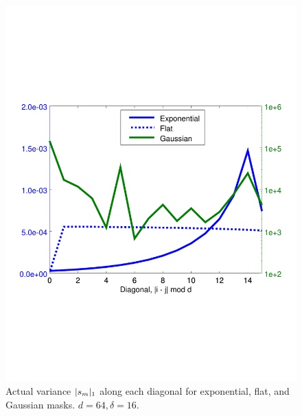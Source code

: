 \begin{figure}
  \centering
    \includegraphics[width=.7\textwidth,trim={.4in 2.5in .8in 2.5in}]{figs/realvar}
  \caption{Actual variance $\lvert s_m\rvert_1$ along each diagonal for exponential, flat, and Gaussian masks.  $d = 64, \delta = 16$.}
  \label{fig:realvar}
\end{figure}

